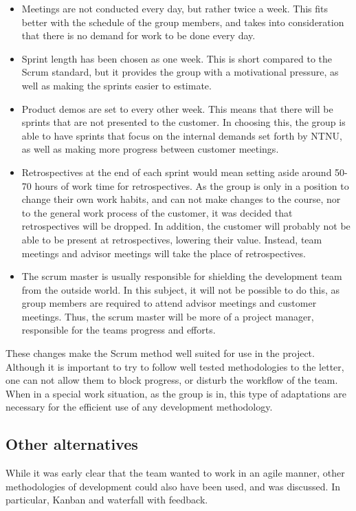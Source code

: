 \documentclass[11pt,a4paper,titlepage,oneside]{report}
\begin{document}
\begin{itemize}
\item Meetings are not conducted every day, but rather twice a week. This fits better with the schedule of the group members, and takes into consideration that there is no demand for work to be done every day. 
\item Sprint length has been chosen as one week. This is short compared to the Scrum standard, but it provides the group with a motivational pressure, as well as making the sprints easier to estimate. 
\item Product demos are set to every other week. This means that there will be sprints that are not presented to the customer. In choosing this, the group is able to have sprints that focus on the internal demands set forth by \gls{NTNU}, as well as making more progress between customer meetings.
\item Retrospectives at the end of each sprint would mean setting aside around 50-70 hours of work time for retrospectives. As the group is only in a position to change their own work habits, and can not make changes to the course, nor to the general work process of the customer, it was decided that retrospectives will be dropped. In addition, the customer will probably not be able to be present at retrospectives, lowering their value. Instead, team meetings and advisor meetings will take the place of retrospectives. 
\item The scrum master is usually responsible for shielding the development team from the outside world. In this subject, it will not be possible to do this, as group members are required to attend advisor meetings and customer meetings. Thus, the scrum master will be more of a project manager, responsible for the teams progress and efforts. 
\end {itemize}

These changes make the Scrum method well suited for use in the project. Although it is important to try to follow well tested methodologies to the letter, one can not allow them to block progress, or disturb the workflow of the team. When in a special work situation, as the group is in, this type of adaptations are necessary for the efficient use of any development methodology. 

\subsection{Other alternatives}
While it was early clear that the team wanted to work in an agile manner, other methodologies of development could also have been used, and was discussed. In particular, Kanban and waterfall with feedback.
\end{document}
